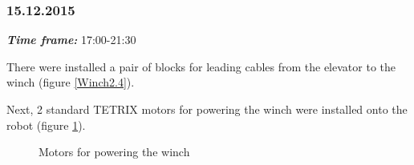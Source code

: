 \subsubsection{15.12.2015}
\textit{\textbf{Time frame:}} 17:00-21:30 

There were installed a pair of blocks for leading cables from the elevator to the winch (figure \ref{Winch2.4}).

Next, 2 standard TETRIX motors for powering the winch were installed onto the robot (figure \ref{Winch2.3}).

\begin{figure}[H]
	\begin{minipage}[h]{0.31\linewidth}
		\caption{Motors for powering the winch}
		\label{Winch2.3}
	\end{minipage}
	\hfill
	\begin{minipage}[h]{0.31\linewidth}

\end{minipage}
\end{figure}
